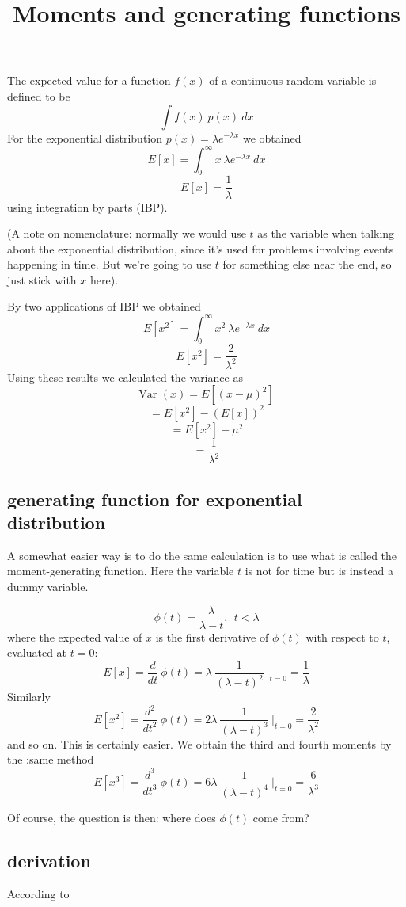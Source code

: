 \documentclass[11pt, oneside]{article}   	%
\title{Moments and generating functions}
\date{}							%
\begin{document}
\maketitle
\Large
The expected value for a function $f(x)$ of a continuous random variable is defined to be
\[ \int f(x) \ p(x) \ dx \]
For the exponential distribution $p(x) = \lambda e^{-\lambda x}$ we obtained
\[ E[x] = \int_0^{\infty} x \  \lambda e^{-\lambda x} \ dx \]
\[ E[x] = \frac{1}{\lambda} \]
using integration by parts (IBP).

(A note on nomenclature:  normally we would use $t$ as the variable when talking about the exponential distribution, since it's used for problems involving events happening in time.  But we're going to use $t$ for something else near the end, so just stick with $x$ here).

By two applications of IBP we obtained
\[ E[x^2] = \int_0^{\infty} x^2 \  \lambda e^{-\lambda x} \ dx \]
\[ E[x^2] = \frac{2}{\lambda^2} \]
Using these results we calculated the variance as
\[ \text{Var }(x) = E [(x - \mu)^2 ] \]
\[ = E[x^2] - (E[x])^2 \]
\[ = E[x^2] - \mu^2 \]
\[ = \frac{1}{\lambda^2} \]

\subsection*{generating function for exponential distribution}
A somewhat easier way is to do the same calculation is to use what is called the moment-generating function.  Here the variable $t$ is not for time but is instead a dummy variable.

\[ \phi(t) = \frac{\lambda}{\lambda - t}, \ \ t < \lambda \]
where the expected value of $x$ is the first derivative of $\phi(t)$ with respect to $t$, evaluated at $t=0$:
\[ E[x] = \frac{d}{dt} \ \phi(t) = \lambda \ \frac{1}{(\lambda - t)^2} \ \bigg |_{t=0} = \frac{1}{\lambda} \]
Similarly
\[ E[x^2] = \frac{d^2}{dt^2} \ \phi(t) = 2 \lambda \ \frac{1}{(\lambda - t)^3} \ \bigg |_{t=0}  = \frac{2}{\lambda^2}  \]
and so on.
This is certainly easier.  We obtain the third and fourth moments by the :same method
\[ E[x^3] = \frac{d^3}{dt^3} \ \phi(t) = 6 \lambda \ \frac{1}{(\lambda - t)^4} \ \bigg |_{t=0}  = \frac{6}{\lambda^3}  \]

Of course, the question is then:  where does $\phi(t)$ come from?  
\subsection*{derivation}
According to
\end{document}
